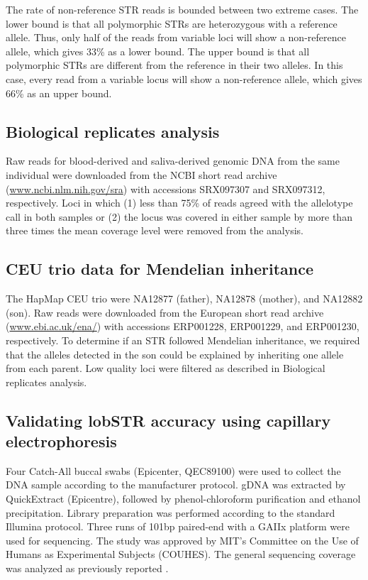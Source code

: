 The rate of non-reference STR reads is bounded between two extreme cases. The lower bound is that all polymorphic STRs are heterozygous with a reference allele. Thus, only half of the reads from variable loci will show a non-reference allele, which gives 33\% as a lower bound. The upper bound is that all polymorphic STRs are different from the reference in their two alleles. In this case, every read from a variable locus will show a non-reference allele, which gives 66\% as an upper bound.  

\subsection{Biological replicates analysis}
Raw reads for blood-derived and saliva-derived genomic DNA from the same individual were downloaded from the NCBI short read archive (\url{www.ncbi.nlm.nih.gov/sra}) with accessions SRX097307 and SRX097312, respectively. Loci in which (1) less than 75\% of reads agreed with the allelotype call in both samples or (2) the locus was covered in either sample by more than three times the mean coverage level were removed from the analysis.

\subsection{CEU trio data for Mendelian inheritance}
The HapMap CEU trio were NA12877 (father), NA12878 (mother), and NA12882 (son). Raw reads were downloaded from the European short read archive (\url{www.ebi.ac.uk/ena/}) with accessions ERP001228, ERP001229, and ERP001230, respectively. To determine if an STR followed Mendelian inheritance, we required that the alleles detected in the son could be explained by inheriting one allele from each parent. Low quality loci were filtered as described in Biological replicates analysis.

\subsection{Validating lobSTR accuracy using capillary electrophoresis}
Four Catch-All buccal swabs (Epicenter, QEC89100) were used to collect the DNA sample according to the manufacturer protocol. gDNA was extracted by QuickExtract (Epicentre), followed by phenol-chloroform purification and ethanol precipitation. Library preparation was performed according to the standard Illumina protocol. Three runs of 101bp paired-end with a GAIIx platform were used for sequencing. The study was approved by MIT's Committee on the Use of Humans as Experimental Subjects (COUHES). The general sequencing coverage was analyzed as previously reported \cite{ErlichEdvardsonHodgesEtAl2011}. 

